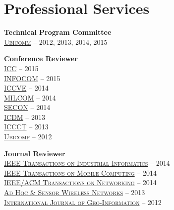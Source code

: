 \section{\sc Professional Services}
{\bf Technical Program Committee}\\
{\href{http://www.iaria.org/conferences.html}{\textsc{Ubicomm}}} -- 2012, 2013, 2014, 2015

{\bf Conference Reviewer}\\
{\href{http://icc2015.ieee-icc.org/}{\textsc{ICC}}} -- 2015\\
{\href{http://infocom2015.ieee-infocom.org/}{\textsc{INFOCOM}}} -- 2015\\
{\href{http://www.iccve.org/2014/}{\textsc{ICCVE}}} -- 2014\\
{\href{http://www.milcom.org/2014/}{\textsc{MILCOM}}} -- 2014\\
{\href{http://secon2014.ieee-secon.org}{\textsc{SECON}}} -- 2014\\
{\href{http://icdm2013.rutgers.edu}{\textsc{ICDM}}} -- 2013\\
{\href{http://www.mnnit.ac.in/iccct2013}{\textsc{ICCCT}}} -- 2013\\
{\href{http://www.ubicomp.org/ubicomp2012}{\textsc{Ubicomp}}} -- 2012

{\bf Journal Reviewer}\\
{\href{http://tii.ieee-ies.org}{\textsc{IEEE Transactions on Industrial Informatics}}} -- 2014\\
{\href{http://www.computer.org/portal/web/tmc}{\textsc{IEEE Transactions on Mobile Computing}}} -- 2014\\
{\href{http://www.ifp.illinois.edu/ton}{\textsc{IEEE/ACM Transactions on Networking}}} -- 2014\\
{\href{http://www.oldcitypublishing.com/AHSWN/AHSWN.html}{\textsc{Ad Hoc \& Sensor Wireless Networks}}} -- 2013\\
{\href{http://www.mdpi.com/journal/ijgi}{\textsc{International Journal of Geo-Information}}} -- 2012
